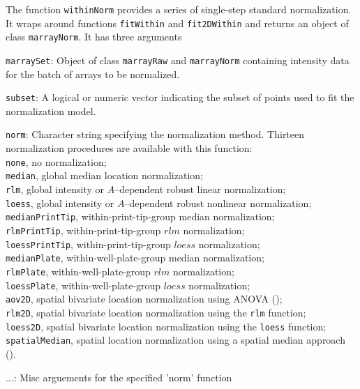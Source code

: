 \documentclass[11pt]{article}
\newcommand{\code}[1]{{\tt #1}}
\newcommand{\Rfunc}[1]{{\tt #1}}
\begin{document}
The function \Rfunc{withinNorm} provides a series of single-step
standard normalization. It wraps around functions \Rfunc{fitWithin} and 
\Rfunc{fit2DWithin} and returns an object of class {\tt marrayNorm}.
It has three arguments
\begin{description}
  \item
    {\code{marraySet}:} Object of class \code{marrayRaw} and \code{marrayNorm} 
    containing intensity data for the batch of arrays to be normalized. 
  \item
    {\code{subset}:} A logical or numeric vector indicating the subset of points 
    used to fit the normalization model.
  \item
    {\code{norm}:} Character string specifying the normalization method. 
    Thirteen normalization procedures are available with this function: \\
    \code{none},   no normalization; \\
    \code{median},   global median location normalization; \\ 
    \code{rlm},   global intensity or $A$--dependent robust linear 
    normalization; \\
    \code{loess},   global intensity or $A$--dependent robust nonlinear normalization; \\
    \code{medianPrintTip},   within-print-tip-group median normalization; \\
    \code{rlmPrintTip},   within-print-tip-group $rlm$ normalization; \\
    \code{loessPrintTip},   within-print-tip-group $loess$ normalization; \\
    \code{medianPlate},   within-well-plate-group median normalization; \\
    \code{rlmPlate},   within-well-plate-group $rlm$ normalization; \\
    \code{loessPlate},   within-well-plate-group $loess$ normalization; \\
    \code{aov2D},   spatial bivariate location normalization using ANOVA (\cite{Sellersetal03}); \\
    \code{rlm2D},   spatial bivariate location normalization using the \code{rlm} function; \\
    \code{loess2D},   spatial bivariate location normalization using the \code{loess} function; \\
    \code{spatialMedian},   spatial location normalization using a spatial median approach (\cite{Wilsonetal03}).
  \item
    {\code{$\dots$}:} Misc arguements for the specified 'norm' function
\end{description}
 
\end{document}
